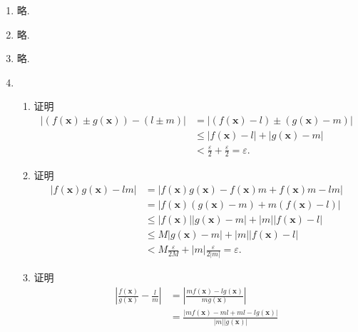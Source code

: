 % 
\begin{enumerate}
    \item %
        略.
    \item %
        略.
    \item %
        略.
    \item %
        \begin{enumerate}[(1)]
            \item %
                {\heiti 证明}\quad \begin{align*}
                    |(f(\boldsymbol{x}) \pm g(\boldsymbol{x})) - (l \pm m)| &= |(f(\boldsymbol{x}) - l) \pm (g(\boldsymbol{x}) - m)| \\
                    &\leqslant |f(\boldsymbol{x}) - l| + |g(\boldsymbol{x}) - m| \\
                    &< \frac{\varepsilon}{2} + \frac{\varepsilon}{2} = \varepsilon.
                \end{align*}
            \item %
                {\heiti 证明}\quad \begin{align*}
                    |f(\boldsymbol{x})g(\boldsymbol{x}) - lm| &= |f(\boldsymbol{x})g(\boldsymbol{x}) - f(\boldsymbol{x})m + f(\boldsymbol{x})m - lm| \\
                    &= |f(\boldsymbol{x})(g(\boldsymbol{x}) - m) + m(f(\boldsymbol{x}) - l)| \\
                    &\leqslant |f(\boldsymbol{x})||g(\boldsymbol{x}) - m| + |m||f(\boldsymbol{x}) - l| \\
                    &\leqslant M|g(\boldsymbol{x}) - m| + |m||f(\boldsymbol{x}) - l| \\
                    &< M\frac{\varepsilon}{2M} + |m|\frac{\varepsilon}{2|m|} = \varepsilon.
                \end{align*}
            \item %
                {\heiti 证明}\quad 
                \begin{align*}
                    \left| \frac{f(\boldsymbol{x})}{g(\boldsymbol{x})} - \frac{l}{m} \right| &= \left| \frac{mf(\boldsymbol{x}) - lg(\boldsymbol{x})}{mg(\boldsymbol{x})} \right| \\
                    &= \frac{|mf(\boldsymbol{x}) - ml + ml - lg(\boldsymbol{x})|}{|m||g(\boldsymbol{x})|} \\

\end{align*}
\end{enumerate}
\end{enumerate}
